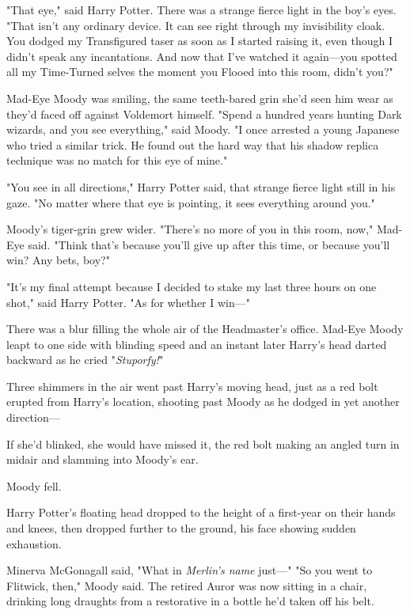 "That eye," said Harry Potter. There was a strange fierce light in the boy's
eyes. "That isn't any ordinary device. It can see right through my invisibility
cloak. You dodged my Transfigured taser as soon as I started raising it, even
though I didn't speak any incantations. And now that I've watched it
again---you spotted all my Time-Turned selves the moment you Flooed into this
room, didn't you?"

Mad-Eye Moody was smiling, the same teeth-bared grin she'd seen him wear as
they'd faced off against Voldemort himself. "Spend a hundred years hunting Dark
wizards, and you see everything," said Moody. "I once arrested a young Japanese
who tried a similar trick. He found out the hard way that his shadow replica
technique was no match for this eye of mine."

"You see in all directions," Harry Potter said, that strange fierce light still
in his gaze. "No matter where that eye is pointing, it sees everything around
you."

Moody's tiger-grin grew wider. "There's no more of you in this room, now,"
Mad-Eye said. "Think that's because you'll give up after this time, or because
you'll win? Any bets, boy?"

"It's my final attempt because I decided to stake my last three hours on one
shot," said Harry Potter. "As for whether I win\mbox{---}"

There was a blur filling the whole air of the Headmaster's office. Mad-Eye
Moody leapt to one side with blinding speed and an instant later Harry's head
darted backward as he cried "\emph{Stuporfy!}"

Three shimmers in the air went past Harry's moving head, just as a red bolt
erupted from Harry's location, shooting past Moody as he dodged in yet another
direction---

If she'd blinked, she would have missed it, the red bolt making an angled turn
in midair and slamming into Moody's ear.

Moody fell.

Harry Potter's floating head dropped to the height of a first-year on their
hands and knees, then dropped further to the ground, his face showing sudden
exhaustion.

Minerva McGonagall said, "What in \emph{Merlin's name} just\mbox{---}"
\sbreak
"So you went to Flitwick, then," Moody said. The retired Auror was now sitting
in a chair, drinking long draughts from a restorative in a bottle he'd taken
off his belt.

